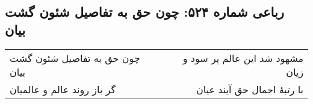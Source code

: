 \begin{center}
\section*{رباعی شماره ۵۲۴: چون حق به تفاصیل شئون گشت بیان}
\label{sec:sh524}
\begin{longtable}{l p{0.5cm} r}
چون حق به تفاصیل شئون گشت بیان
&&
مشهود شد این عالم پر سود و زیان
\\
گر باز روند عالم و عالمیان
&&
با رتبهٔ اجمال حق آیند عیان
\\
\end{longtable}
\end{center}
